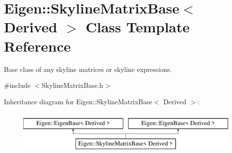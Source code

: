 \hypertarget{class_eigen_1_1_skyline_matrix_base}{}\section{Eigen\+:\+:Skyline\+Matrix\+Base$<$ Derived $>$ Class Template Reference}
\label{class_eigen_1_1_skyline_matrix_base}


Base class of any skyline matrices or skyline expressions.  




{\ttfamily \#include $<$Skyline\+Matrix\+Base.\+h$>$}

Inheritance diagram for Eigen\+:\+:Skyline\+Matrix\+Base$<$ Derived $>$\+:\begin{figure}[H]
\begin{center}
\leavevmode
\includegraphics[height=2.000000cm]{class_eigen_1_1_skyline_matrix_base}
\end{center}
\end{figure}

